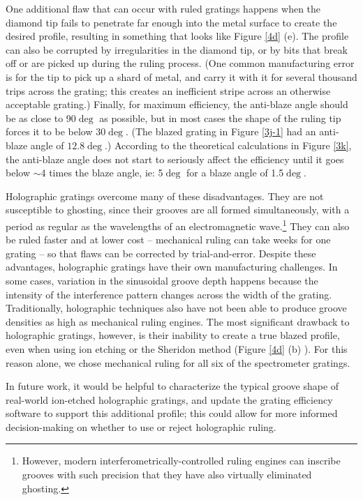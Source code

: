 One additional flaw that can occur with ruled gratings happens when the diamond tip fails to penetrate far enough into the metal surface to create the desired profile, resulting in something that looks like Figure \ref{4d} (e).  The profile can also be corrupted by irregularities in the diamond tip, or by bits that break off or are picked up during the ruling process.  (One common manufacturing error is for the tip to pick up a shard of metal, and carry it with it for several thousand trips across the grating; this creates an inefficient stripe across an otherwise acceptable grating.)  Finally, for maximum efficiency, the anti-blaze angle should be as close to 90$\deg$ as possible, but in most cases the shape of the ruling tip forces it to be below 30$\deg$.  (The blazed grating in Figure \ref{3j-1} had an anti-blaze angle of $12.8\deg$.)  According to the theoretical calculations in Figure \ref{3k}, the anti-blaze angle does not start to seriously affect the efficiency until it goes below $\sim$4 times the blaze angle, ie: 5$\deg$ for a blaze angle of 1.5$\deg$.

Holographic gratings overcome many of these disadvantages.  They are not susceptible to ghosting, since their grooves are all formed simultaneously, with a period as regular as the wavelengths of an electromagnetic wave.\footnote{However, modern interferometrically-controlled ruling engines can inscribe grooves with such precision that they have also virtually eliminated ghosting.}  They can also be ruled faster and at lower cost -- mechanical ruling can take weeks for one grating -- so that flaws can be corrected by trial-and-error.  Despite these advantages, holographic gratings  have their own manufacturing challenges.  In some cases, variation in the sinusoidal groove depth happens because the intensity of the interference pattern changes across the width of the grating.  Traditionally, holographic techniques also have not been able to produce groove densities as high as mechanical ruling engines.  The most significant drawback to holographic gratings, however, is their inability to create a true blazed profile, even when using ion etching or the Sheridon method (Figure \ref{4d} (b) ).  For this reason alone, we chose mechanical ruling for all six of the spectrometer gratings.

In future work, it would be helpful to characterize the typical groove shape of real-world ion-etched holographic gratings, and update the grating efficiency software to support this additional profile; this could allow for more informed decision-making on whether to use or reject holographic ruling.

